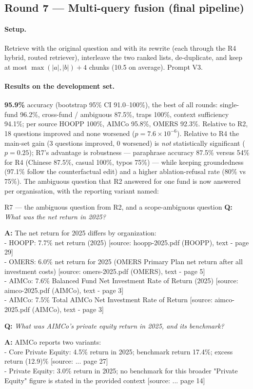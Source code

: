 \documentclass[11pt,a4paper]{article}
\newcommand{\Q}[1]{\noindent\textbf{Q:} \textit{#1}\par\smallskip}
\newcommand{\A}[1]{\noindent\textbf{A:} {\small\ttfamily #1}\par}
\begin{document}
\subsection{Round 7 --- Multi-query fusion (final pipeline)}
\label{sec:r7}
\paragraph{Setup.} Retrieve with the original question and with its rewrite (each through the R4 hybrid, routed
retriever), interleave the two ranked lists, de-duplicate, and keep at most $\max(|a|,|b|)+4$ chunks (10.5 on
average). Prompt V3.

\paragraph{Results on the development set.} \textbf{95.9\%} accuracy (bootstrap 95\% CI 91.0--100\%), the best of all
rounds: single-fund 96.2\%, cross-fund / ambiguous 87.5\%, traps 100\%, context sufficiency 94.1\%; per source HOOPP
100\%, AIMCo 95.8\%, OMERS 92.3\%. Relative to R2, 18 questions improved and none worsened ($p=7.6\times10^{-6}$).
Relative to R4 the main-set gain (3 questions improved, 0 worsened) is \emph{not} statistically significant
($p=0.25$); R7's advantage is robustness --- paraphrase accuracy 87.5\% versus 54\% for R4 (Chinese 87.5\%, casual
100\%, typos 75\%) --- while keeping groundedness (97.1\% follow the counterfactual edit) and a higher ablation-refusal
rate (80\% vs 75\%). The ambiguous question that R2 answered for one fund is now answered per organisation, with the
reporting variant named:

\begin{qa}{R7 --- the ambiguous question from R2, and a scope-ambiguous question}
\Q{What was the net return in 2025?}
\A{The net return for 2025 differs by organization:\\
- HOOPP: 7.7\% net return (2025) [source: hoopp-2025.pdf (HOOPP), text - page 29]\\
- OMERS: 6.0\% net return for 2025 (OMERS Primary Plan net return after all investment costs) [source: omers-2025.pdf (OMERS), text - page 5]\\
- AIMCo: 7.6\% Balanced Fund Net Investment Rate of Return (2025) [source: aimco-2025.pdf (AIMCo), text - page 3]\\
- AIMCo: 7.5\% Total AIMCo Net Investment Rate of Return [source: aimco-2025.pdf (AIMCo), text - page 3]}
\medskip
\Q{What was AIMCo's private equity return in 2025, and its benchmark?}
\A{AIMCo reports two variants:\\
- Core Private Equity: 4.5\% return in 2025; benchmark return 17.4\%; excess return (12.9)\% [source: ... page 27]\\
- Private Equity: 3.0\% return in 2025; no benchmark for this broader "Private Equity" figure is stated in the provided context [source: ... page 14]}
\end{qa}
\end{document}
